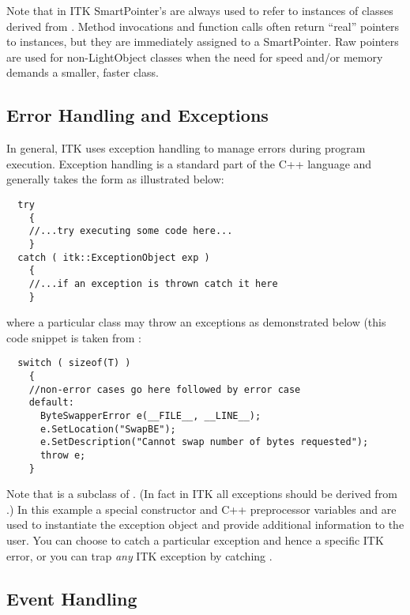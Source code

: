Note that in ITK SmartPointer's are always used to refer to instances of
classes derived from . Method invocations and function
calls often return ``real'' pointers to instances, but they are immediately
assigned to a SmartPointer. Raw pointers are used for non-LightObject classes when
the need for speed and/or memory demands a smaller, faster class.


\subsection{Error Handling and Exceptions}
\label{sec:ErrorHandling}


In general, ITK uses exception handling to manage errors during program
execution. Exception handling is a standard part of the C++ language and
generally takes the form as illustrated below:
\small
\begin{verbatim}
  try
    {
    //...try executing some code here...
    }
  catch ( itk::ExceptionObject exp )
    {
    //...if an exception is thrown catch it here
    }
\end{verbatim}
\normalsize

where a particular class may throw an exceptions as demonstrated below (this
code snippet is taken from :
\small
\begin{verbatim}
  switch ( sizeof(T) )
    {
    //non-error cases go here followed by error case  
    default:  
      ByteSwapperError e(__FILE__, __LINE__);
      e.SetLocation("SwapBE");
      e.SetDescription("Cannot swap number of bytes requested");
      throw e;
    }
\end{verbatim}
\normalsize

Note that  is a subclass of
. (In fact in ITK all exceptions should be derived
from .) In this example a special constructor and C++
preprocessor variables  and  are used to instantiate
the exception object and provide additional information to the user. You can
choose to catch a particular exception and hence a specific ITK error, or you
can trap \emph{any} ITK exception by catching .


\subsection{Event Handling}
\label{sec:EventHandling}

